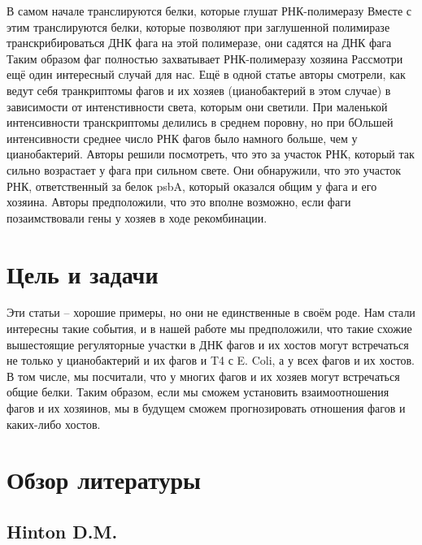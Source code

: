 \documentclass[a4paper,12pt]{article}
\begin{document}
	В самом начале транслируются белки, которые глушат РНК-полимеразу
	Вместе с этим транслируются белки, которые позволяют при заглушенной полимиразе транскрибироваться ДНК фага на этой
	полимеразе, они садятся на ДНК фага
	Таким образом фаг полностью захватывает РНК-полимеразу хозяина
	Рассмотри ещё один интересный случай для нас. Ещё в одной статье авторы смотрели, как ведут себя транкриптомы фагов и
	их хозяев (цианобактерий в этом случае) в зависимости от интенстивности света, которым они светили. При маленькой
	интенсивности транскриптомы делились в среднем поровну, но при бОльшей интенсивности среднее число РНК фагов было
	намного больше, чем у цианобактерий. Авторы решили посмотреть, что это за участок РНК, который так сильно возрастает
	у фага при сильном свете. Они обнаружили, что это участок РНК, ответственный за белок psbA, который оказался общим у
	фага и его хозяина. Авторы предположили, что это вполне возможно, если фаги позаимствовали гены у хозяев в ходе
	рекомбинации.

\newpage
\section{Цель и задачи} \label{sec:code}

Эти статьи – хорошие примеры, но они не единственные в своём роде. Нам стали интересны такие события, и в нашей работе
мы предположили, что такие схожие вышестоящие регуляторные участки в ДНК фагов и их хостов могут встречаться не только у
цианобактерий и их фагов и T4 с E. Coli, а у всех фагов и их хостов.
В том числе, мы посчитали, что у многих фагов и их хозяев могут встречаться общие белки. Таким образом, если мы сможем
установить взаимоотношения фагов и их хозяинов, мы в будущем сможем прогнозировать отношения фагов и каких-либо хостов.

\newpage
\section{Обзор литературы} \label{sec:math}
\subsection{Hinton D.M.}
\end{document}

